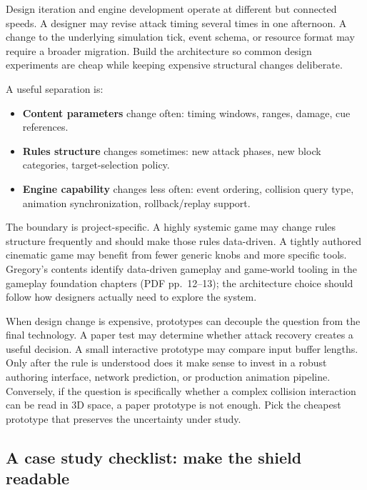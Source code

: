 \hypertarget{06-engine-ii-ch041-the-bridge-from-design-loop-to-architecture-loop}{}

Design iteration and engine development operate at different but connected speeds. A designer may revise attack timing several times in one afternoon. A change to the underlying simulation tick, event schema, or resource format may require a broader migration. Build the architecture so common design experiments are cheap while keeping expensive structural changes deliberate.

A useful separation is:

\begin{itemize}
\tightlist
\item
  \textbf{Content parameters} change often: timing windows, ranges, damage, cue references.
\item
  \textbf{Rules structure} changes sometimes: new attack phases, new block categories, target-selection policy.
\item
  \textbf{Engine capability} changes less often: event ordering, collision query type, animation synchronization, rollback/replay support.
\end{itemize}

The boundary is project-specific. A highly systemic game may change rules structure frequently and should make those rules data-driven. A tightly authored cinematic game may benefit from fewer generic knobs and more specific tools. Gregory's contents identify data-driven gameplay and game-world tooling in the gameplay foundation chapters (PDF pp.~12--13); the architecture choice should follow how designers actually need to explore the system.

When design change is expensive, prototypes can decouple the question from the final technology. A paper test may determine whether attack recovery creates a useful decision. A small interactive prototype may compare input buffer lengths. Only after the rule is understood does it make sense to invest in a robust authoring interface, network prediction, or production animation pipeline. Conversely, if the question is specifically whether a complex collision interaction can be read in 3D space, a paper prototype is not enough. Pick the cheapest prototype that preserves the uncertainty under study.

\subsection{A case study checklist: make the shield readable}\label{06-engine-ii-ch041-a-case-study-checklist-make-the-shield-readable}

